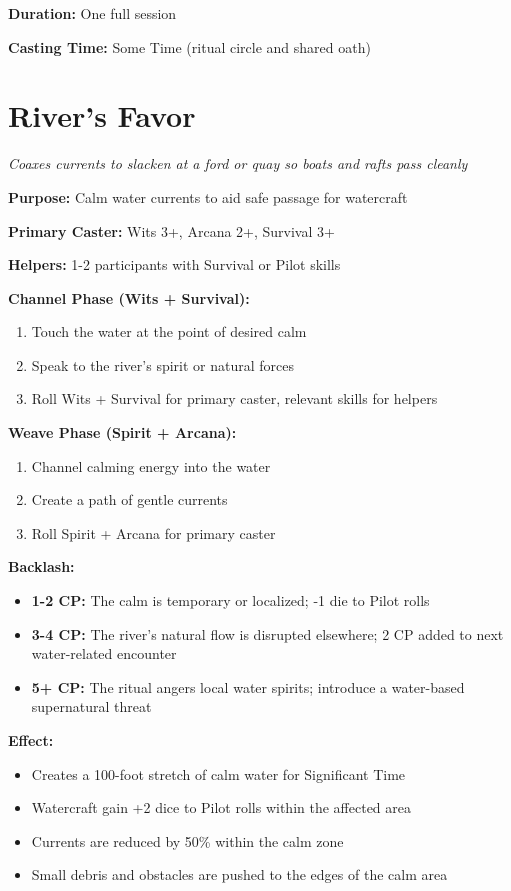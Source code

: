 \documentclass[12pt,twoside]{book}
\begin{document}
\textbf{Duration:} One full session

\textbf{Casting Time:} Some Time (ritual circle and shared oath)

\section*{River's Favor}
\textit{Coaxes currents to slacken at a ford or quay so boats and rafts pass cleanly}

\textbf{Purpose:} Calm water currents to aid safe passage for watercraft

\textbf{Primary Caster:} Wits 3+, Arcana 2+, Survival 3+

\textbf{Helpers:} 1-2 participants with Survival or Pilot skills

\textbf{Channel Phase (Wits + Survival):}
\begin{enumerate}
\item Touch the water at the point of desired calm
\item Speak to the river's spirit or natural forces
\item Roll Wits + Survival for primary caster, relevant skills for helpers
\end{enumerate}

\textbf{Weave Phase (Spirit + Arcana):}
\begin{enumerate}
\item Channel calming energy into the water
\item Create a path of gentle currents
\item Roll Spirit + Arcana for primary caster
\end{enumerate}

\textbf{Backlash:}
\begin{itemize}
\item \textbf{1-2 CP:} The calm is temporary or localized; -1 die to Pilot rolls
\item \textbf{3-4 CP:} The river's natural flow is disrupted elsewhere; 2 CP added to next water-related encounter
\item \textbf{5+ CP:} The ritual angers local water spirits; introduce a water-based supernatural threat
\end{itemize}

\textbf{Effect:}
\begin{itemize}
\item Creates a 100-foot stretch of calm water for Significant Time
\item Watercraft gain +2 dice to Pilot rolls within the affected area
\item Currents are reduced by 50\% within the calm zone
\item Small debris and obstacles are pushed to the edges of the calm area
\end{itemize}
\end{document}
